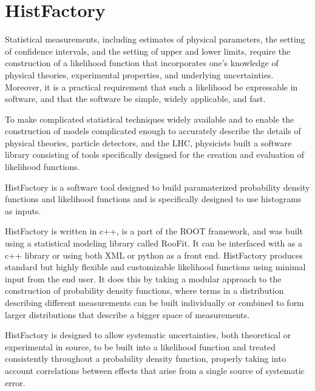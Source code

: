 

\section{HistFactory}

Statistical measurements, including estimates of physical parameters, the setting of confidence intervals, and the setting of upper and lower limits, require the construction of a likelihood function that incorporates one's knowledge of physical theories, experimental properties, and underlying uncertainties.
Moreover, it is a practical requirement that such a likelihood be expressable in software, and that the software be simple, widely applicable, and fast.

To make complicated statistical techniques widely available and to enable the construction of models complicated enough to accurately describe the details of physical theories, particle detectors, and the LHC, physicists built a software library consisting of tools specifically designed for the creation and evaluation of likelihood functions.

HistFactory is a software tool designed to build paramaterized probability density functions and likelihood functions and is specifically designed to use histograms as inputs.

HistFactory is written in c++, is a part of the ROOT framework, and was built using a statistical modeling library called RooFit.
It can be interfaced with as a c++ library or using both XML or python as a front end.
HistFactory produces standard but highly flexible and customizable likelihood functions using minimal input from the end user.
It does this by taking a modular approach to the construction of probability density functions, where terms in a distribution describing different measurements can be built individually or combined to form larger distributions that describe a bigger space of measurements.

HistFactory is designed to allow systematic uncertainties, both theoretical or experimental in source, to be built into a likelihood function and treated consistently throughout a probability density function, properly taking into account correlations between effects that arise from a single source of systematic error.




